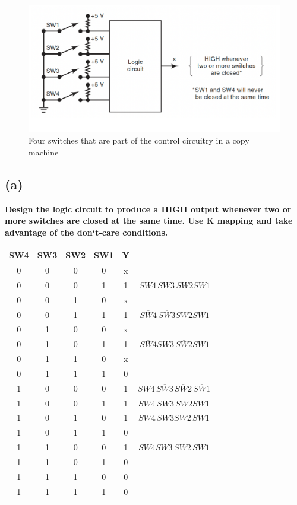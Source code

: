 \documentclass[a4paper,12]{article}
\newcommand{\olsi}[1]{\,\overline{\!{#1}}} %
\begin{document}
\begin{figure}[H]
    \centering
    \includegraphics[width=0.6\linewidth]{q3.png}
    \caption{Four switches that are part of the control circuitry in a copy machine}
    \label{fig:q3}
\end{figure}

\subsection*{(a)} \textbf{Design the logic circuit to produce a HIGH output whenever two or more
switches are closed at the same time. Use K mapping and take advantage
of the don`t-care conditions.}

\begin{center}
\begin{tabular}{cccc|c|c}
    SW4 & SW3 & SW2 & SW1 & Y & \\ \hline
    0 & 0 & 0 & 0 & x & \\
    0 & 0 & 0 & 1 & 1 & $\olsi{SW4} \olsi{SW3} \olsi{SW2} SW1$\\
    0 & 0 & 1 & 0 & x & \\
    0 & 0 & 1 & 1 & 1 & $\olsi{SW4} \olsi{SW3} SW2 SW1$\\
    0 & 1 & 0 & 0 & x & \\
    0 & 1 & 0 & 1 & 1 & $\olsi{SW4} SW3 \olsi{SW2} SW1$\\
    0 & 1 & 1 & 0 & x & \\
    0 & 1 & 1 & 1 & 0 & \\
    1 & 0 & 0 & 0 & 1 & $SW4 \olsi{SW3} \olsi{SW2} \olsi{SW1}$\\
    1 & 0 & 0 & 1 & 1 & $SW4 \olsi{SW3} \olsi{SW2} SW1$\\
    1 & 0 & 1 & 0 & 1 & $SW4 \olsi{SW3} SW2 \olsi{SW1}$\\
    1 & 0 & 1 & 1 & 0 & \\
    1 & 1 & 0 & 0 & 1 & $SW4 SW3 \olsi{SW2} \olsi{SW1}$\\
    1 & 1 & 0 & 1 & 0 & \\
    1 & 1 & 1 & 0 & 0 & \\
    1 & 1 & 1 & 1 & 0 & \\

\end{tabular}
\end{center}
\end{document}
